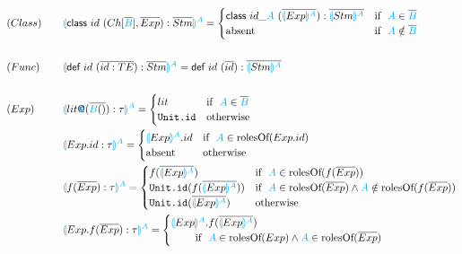 \documentclass{thesis}
\newcommand{\projection}[2]{{\color{cyan}\llparenthesis}#1{\color{cyan}\rrparenthesis^#2}}
\newcommand{\mblue}[1]{\textbf{\textsf{\color{MidnightBlue}#1}}}
\newcommand{\cyan}[1]{\color{cyan}#1}
\begin{document}
\begin{alignat*}{2}
  &(Class)~~~ &&\projection{\textsf{class} ~id~(Ch[\overline{\cyan{B}}],\overline{Exp}):\overline{Stm}}{A}=
  \begin{cases}
    \textsf{class} ~id\_{\cyan{A}}~(\overline{\projection{Exp}{A}}):\overline{\projection{Stm}{A}} & \text{if}~~ {\cyan{A}} \in \overline{\cyan{B}}\\
    \text{absent} & \text{if}~~ {\cyan{A}} \notin \overline{\cyan{B}}
  \end{cases}\\
  \\
  &(Func)~~~ &&\projection{\textsf{def} ~id~(\overline{id:TE}):\overline{Stm}}{A} = \textsf{def} ~id~ (\overline{id}):\overline{\projection{Stm}{A}}\\
  \\
  &(Exp)~~~ &&\projection{lit\mblue{@}(\overline{{\color{cyan}{B}}()}):\tau}{A}=
  \begin{cases}
    lit & \text{if}~~ {\color{cyan}A} \in \overline{\color{cyan}{B}}\\
    \texttt{Unit.id} &\text{otherwise}
  \end{cases}\\
  &&&\projection{Exp.id:\tau}{A}=
  \begin{cases}
    \projection{Exp}{A}.id &\text{if}~~{\color{cyan}A} \in \text{rolesOf} (Exp.id)\\
    \text{absent} &\text{otherwise}
  \end{cases}\\
  &&&\projection{f(\overline{Exp}):\tau}{A} =
  \begin{cases}
    f(\overline{\projection{Exp}{A}}) &\text{if}~~ {\color{cyan}A} \in \text{rolesOf} (f(\overline{Exp}))\\
    \texttt{Unit.id}(f(\overline{\projection{Exp}{A}})) &\text{if}~~ {\color{cyan}A} \in \text{rolesOf}(\overline{Exp}) \wedge {\color{cyan}A} \notin \text{rolesOf} (f(\overline{Exp}))\\
    \texttt{Unit.id}(\overline{\projection{Exp}{A}}) &\text{otherwise}
  \end{cases}\\
  &&&\projection{Exp.f(\overline{Exp}):\tau}{A}=
  \begin{cases}
    \projection{Exp}{A}.f(\overline{\projection{Exp}{A}}) \\
    ~~~~~~~\text{if}~~ {\color{cyan}A} \in \text{rolesOf}(Exp) \wedge {\color{cyan}A} \in \text{rolesOf}(\overline{Exp})\\

\end{cases}
\end{alignat*}
\end{document}
